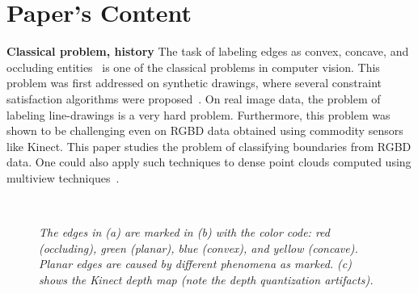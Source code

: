 


\section{Paper's Content}
\textbf{Classical problem, history}
The task of labeling edges as convex, concave, and occluding entities~\cite{kanade1981recovery,Koenderink1984,lineCurvedObjects,mild-sugihara}
is one of the classical problems in computer vision. This problem was first addressed on synthetic drawings, where several 
constraint satisfaction algorithms were proposed~\cite{mild-sugihara}. On real image data, the problem of labeling 
line-drawings is a very hard problem. Furthermore, this problem was shown to be challenging even on RGBD data obtained 
using commodity sensors like Kinect. This paper studies the problem of classifying boundaries from RGBD data. 
One could also apply such techniques to dense point clouds computed using multiview 
techniques~\cite{furukawa-PAMI10,Snavely2006}. 
\begin{figure}[t]
\centering
        \hfill
        \hfill
        \\
\caption{\it The edges in (a) are marked in (b) with the color code: red (occluding), green (planar),
blue (convex), and yellow (concave). Planar edges are caused by different phenomena as marked.
(c) shows the Kinect depth map (note the depth quantization artifacts).}
\label{fig:EdgeLabeling}
\end{figure}	

